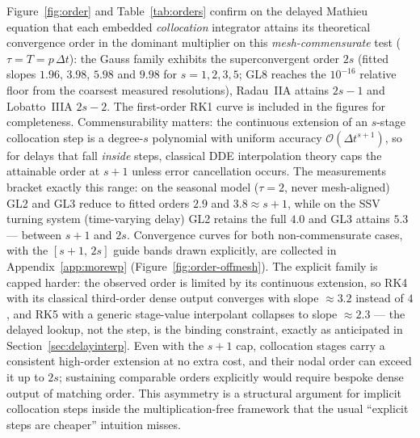 \documentclass[Afour,sageh,times]{sagej}
\begin{document}
Figure~\ref{fig:order} and Table~\ref{tab:orders} confirm on the delayed
Mathieu equation that each embedded \emph{collocation} integrator attains its
theoretical convergence order in the dominant multiplier on this
\emph{mesh-commensurate} test ($\tau = T = p\,\Delta t$): the Gauss family
exhibits the superconvergent order $2s$ (fitted slopes $1.96$, $3.98$,
$5.98$ and $9.98$ for $s = 1, 2, 3, 5$; GL8 reaches the $10^{-16}$ relative
floor from the coarsest measured resolutions), Radau~IIA attains $2s-1$ and Lobatto~IIIA
$2s-2$. The first-order RK1 curve is included in the figures for
completeness. Commensurability matters: the continuous extension of an $s$-stage
collocation step is a degree-$s$ polynomial with uniform accuracy
$\mathcal{O}(\Delta t^{s+1})$, so for delays that fall \emph{inside} steps,
classical DDE interpolation theory \citep{BellenZennaro2003} caps the
attainable order at $s{+}1$ unless error cancellation occurs.
The measurements bracket exactly this range: on the seasonal model
($\tau = 2$, never mesh-aligned) GL2 and GL3 reduce to fitted orders
$2.9$ and $3.8 \approx s{+}1$, while on the SSV turning system (time-varying
delay) GL2 retains the full $4.0$ and GL3 attains $5.3$ --- between
$s{+}1$ and $2s$. Convergence curves for both non-commensurate cases, with
the $[s{+}1,\, 2s]$ guide bands drawn explicitly, are collected in
Appendix~\ref{app:morewp} (Figure~\ref{fig:order-offmesh}). The explicit
family is capped harder: the
observed order is limited by its continuous extension, so RK4 with its
classical third-order dense output converges with slope $\approx 3.2$
instead of $4$, and RK5 with a generic stage-value interpolant collapses to
slope $\approx 2.3$ --- the delayed lookup, not the step, is the binding
constraint, exactly as anticipated in Section~\ref{sec:delayinterp}. Even
with the $s{+}1$ cap, collocation stages carry a consistent
high-order extension at no extra cost, and their nodal order can exceed it
up to $2s$; sustaining comparable orders explicitly would require bespoke
dense output of matching order. This asymmetry is a structural argument for
implicit collocation steps inside the multiplication-free framework that the
usual ``explicit steps are cheaper'' intuition misses.
\end{document}
